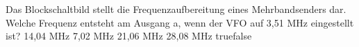     {Das Blockschaltbild stellt die Frequenzaufbereitung eines Mehrbandsenders dar. Welche Frequenz entsteht am Ausgang a, wenn der VFO auf 3,51 MHz eingestellt ist?}
    {14,04 MHz}
    {7,02 MHz}
    {21,06 MHz}
    {28,08 MHz}
    {true}{false}